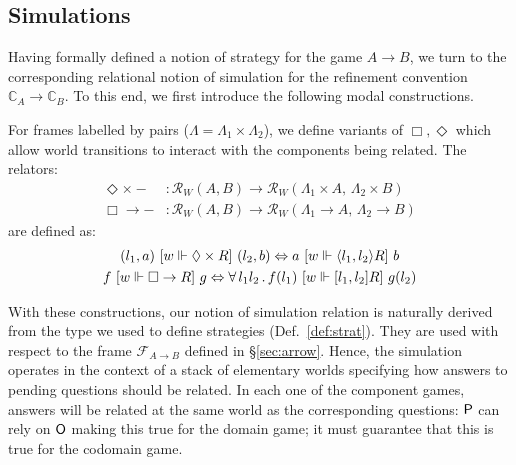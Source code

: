

\subsection{Simulations} %
\label{sec:sim}

Having formally defined a notion of strategy
for the game $A \rightarrow B$,
we turn to the corresponding relational notion of simulation
for the refinement convention $\mathbb{C}_A \rightarrow \mathbb{C}_B$.
To this end,
we first introduce the following modal constructions.

\begin{definition} %
For frames labelled by pairs
($\Lambda = \Lambda_1 \times \Lambda_2$),
we define variants of $\Box, \Diamond$ which
allow world transitions to interact with the components
being related.
The relators:
\begin{align*}
  \Diamond \times {-} &: \mathcal{R}_W(A, B) \rightarrow
              \mathcal{R}_W(\Lambda_1 \times A, \, \Lambda_2 \times B) \\
  \Box \rightarrow - &: \mathcal{R}_W(A, B) \rightarrow
          \mathcal{R}_W(\Lambda_1 \rightarrow A, \, \Lambda_2 \rightarrow B)
\end{align*}
are defined as:
\begin{gather*}
  (l_1, a) \ [{w \Vdash \Diamond \times R}]\  (l_2, b) \Leftrightarrow
    a \ [{w \Vdash \langle l_1, l_2 \rangle R}]\  b \\
  f \ [{w \Vdash \Box \rightarrow R}]\  g \Leftrightarrow
    \forall \, l_1 l_2 \,.\, f(l_1) \ [{w \Vdash [l_1, l_2] R}]\  g(l_2)
\end{gather*}
\end{definition}

With these constructions,
our notion of simulation relation
is naturally derived from
the type we used to define strategies (Def.~\ref{def:strat}).
They are used
with respect to the frame $\mathcal{F}_{A \rightarrow B}$
defined in \S\ref{sec:arrow}.
Hence, the simulation operates in the context of
a stack of elementary worlds
specifying how answers to pending questions
should be related.
In each one of the component games,
answers will be related at the same world as the corresponding questions:
$ \mathsf{P} $ can rely on $ \mathsf{O} $ making this true for the domain game;
it must guarantee that this is true for the codomain game.

